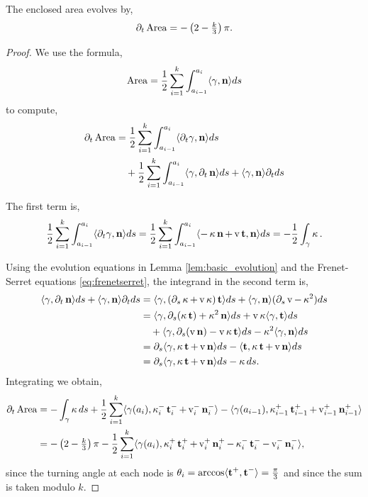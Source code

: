 \documentclass[12pt]{amsart}
\begin{document}
\begin{lemma}
\label{lem:dtA}
The enclosed area evolves by,
\[
\partial_t \operatorname{Area} = - \left(2 - \tfrac{k}{3}\right)\pi.
\]
\end{lemma}

\begin{proof}
We use the formula,
\[
\operatorname{Area} = \frac{1}{2} \sum_{i=1}^k \int_{a_{i-1}}^{a_i} \langle{\gamma},{\operatorname{\mathbf{n}}}\rangle ds
\]
to compute,
\[
\begin{split}
\partial_t \operatorname{Area} &= \frac{1}{2} \sum_{i=1}^k \int_{a_{i-1}}^{a_i} \langle{\partial_t \gamma},{\operatorname{\mathbf{n}}}\rangle ds \\
&\quad + \frac{1}{2} \sum_{i=1}^k \int_{a_{i-1}}^{a_i} \langle{\gamma},{\partial_t \operatorname{\mathbf{n}}}\rangle ds + \langle{\gamma},{\operatorname{\mathbf{n}}}\rangle \partial_t ds
\end{split}
\]

The first term is,
\[
\frac{1}{2} \sum_{i=1}^k \int_{a_{i-1}}^{a_i} \langle{\partial_t \gamma},{\operatorname{\mathbf{n}}}\rangle ds = \frac{1}{2} \sum_{i=1}^k \int_{a_{i-1}}^{a_i} \langle{-\operatorname{\kappa}\operatorname{\mathbf{n}}+ \operatorname{v}\operatorname{\mathbf{t}}},{\operatorname{\mathbf{n}}}\rangle ds = -\frac{1}{2} \int_{\gamma} \operatorname{\kappa}.
\]

Using the evolution equations in Lemma \ref{lem:basic_evolution} and the Frenet-Serret equations \eqref{eq:frenetserret}, the integrand in the second term is,
\[
\begin{split}
\langle{\gamma},{\partial_t \operatorname{\mathbf{n}}}\rangle ds + \langle{\gamma},{\operatorname{\mathbf{n}}}\rangle \partial_t ds &= \langle{\gamma},{(\partial_s \operatorname{\kappa} + \operatorname{v} \operatorname{\kappa})\operatorname{\mathbf{t}}}\rangle ds + \langle{\gamma},{\operatorname{\mathbf{n}}}\rangle (\partial_s \operatorname{v} - \operatorname{\kappa}^2) ds \\
&= \langle{\gamma},{\partial_s(\operatorname{\kappa}\operatorname{\mathbf{t}}) + \operatorname{\kappa}^2 \operatorname{\mathbf{n}}}\rangle ds + \operatorname{v}\operatorname{\kappa} \langle{\gamma},{\operatorname{\mathbf{t}}}\rangle ds \\
&\quad + \langle{\gamma},{\partial_s (\operatorname{v} \operatorname{\mathbf{n}}) - \operatorname{v} \operatorname{\kappa} \operatorname{\mathbf{t}}}\rangle ds - \operatorname{\kappa}^2 \langle{\gamma},{\operatorname{\mathbf{n}}}\rangle ds \\
&= \partial_s \langle{\gamma},{\operatorname{\kappa}\operatorname{\mathbf{t}} + \operatorname{v} \operatorname{\mathbf{n}}}\rangle ds - \langle{\operatorname{\mathbf{t}}},{\operatorname{\kappa} \operatorname{\mathbf{t}} + \operatorname{v} \operatorname{\mathbf{n}}}\rangle ds \\
&= \partial_s \langle{\gamma},{\operatorname{\kappa}\operatorname{\mathbf{t}} + \operatorname{v} \operatorname{\mathbf{n}}}\rangle ds - \operatorname{\kappa} ds.
\end{split}
\]
Integrating we obtain,
\begin{equation}
\label{eq:dtA_prelim}
\begin{split}
\partial_t \area &= -\int_{\gamma} \curvecurv ds + \frac{1}{2} \sum_{i=1}^k \ip{\gamma(a_i)}{\curvecurv_i^- \tang_i^- + \tangspeed_i^- \nor_i^-} - \ip{\gamma(a_{i-1})}{\curvecurv_{i-1}^+ \tang_{i-1}^+ + \tangspeed_{i-1}^+ \nor_{i-1}^+} \\
&= - \left(2 - \tfrac{k}{3}\right)\pi - \frac{1}{2} \sum_{i=1}^k \ip{\gamma(a_i)}{\curvecurv_i^+ \tang_i^+ + \tangspeed_i^+ \nor_i^+ - \curvecurv_i^- \tang_i^- - \tangspeed_i^- \nor_i^-},
\end{split}
\end{equation}
since the turning angle at each node is \(\theta_i = \arccos \langle{\operatorname{\mathbf{t}}^+},{\operatorname{\mathbf{t}}^-}\rangle = \tfrac{\pi}{3}\) and since the sum is taken modulo \(k\).


\end{proof}
\end{document}
